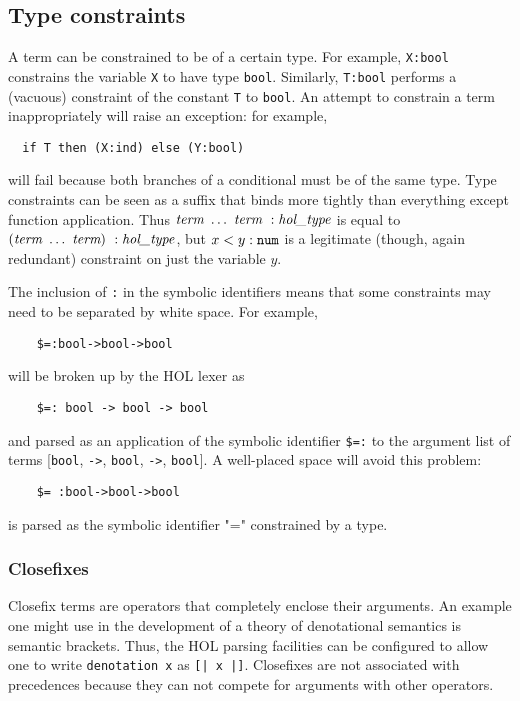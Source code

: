 \documentclass[12pt,fleqn,a4paper]{report}
\newcommand{\type}       {\mbox{\it hol\_type}}
\newcommand{\term}       {\mbox{\it term}}
\begin{document}
\subsection{Type constraints}

A term can be constrained to be of a certain type.  For example,
\verb+X:bool+ constrains the variable \verb+X+ to have type
\verb+bool+. Similarly, \verb+T:bool+ performs a (vacuous) constraint
of the constant \verb+T+ to \verb+bool+. An attempt to constrain a
term inappropriately will raise an exception: for example,
\begin{verbatim}
  if T then (X:ind) else (Y:bool)
\end{verbatim}
will fail because both branches of a conditional must be of the same
type.  Type constraints can be seen as a suffix that binds more
tightly than everything except function application.  Thus $\term\
\ldots\ \term \ : \type$ is equal to $(\term\ \ldots\ \term)\ :
\type$, but $x < y:\mbox{\tt num}$ is a legitimate (though, again
redundant) constraint on just the variable $y$.

The inclusion of \verb+:+ in the symbolic identifiers means that some
constraints may need to be separated by white space. For example,
\begin{verbatim}
    $=:bool->bool->bool
\end{verbatim}
will be broken up by the HOL lexer as
\begin{verbatim}
    $=: bool -> bool -> bool
\end{verbatim}
and parsed as an application of the symbolic identifier \verb+$=:+ to
the argument list of terms [\verb+bool+, \verb+->+, \verb+bool+,
\verb+->+, \verb+bool+]. A well-placed space will avoid this problem:
\begin{verbatim}
    $= :bool->bool->bool
\end{verbatim}
is parsed as the symbolic identifier "=" constrained by a type.

\subsubsection{Closefixes}

Closefix terms are operators that completely enclose their arguments.
An example one might use in the development of a theory of
denotational semantics is semantic brackets.  Thus, the HOL parsing
facilities can be configured to allow one to write \texttt{denotation x}
as \texttt{[| x |]}.  Closefixes are not associated with precedences
because they can not compete for arguments with other operators.
\end{document}
